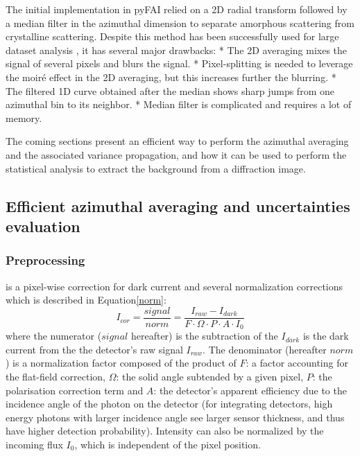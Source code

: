 \documentclass[preprint]{iucr}              %
\begin{document}
The initial implementation in pyFAI \cite{pdj2013} relied on a 2D radial transform followed by a median filter in the azimuthal dimension 
to separate amorphous scattering from crystalline scattering.
Despite this method has been successfully used for large dataset analysis \cite{brocades}, it has several major drawbacks:
* The 2D averaging mixes the signal of several pixels and blurs the signal. 
* Pixel-splitting is needed to leverage the moiré effect in the 2D averaging, but this increases further the blurring. 
* The filtered 1D curve obtained after the median shows sharp jumps from one azimuthal bin to its neighbor.
* Median filter is complicated and requires a lot of memory.
    
The coming sections present an efficient way to perform the azimuthal averaging and the associated variance propagation, 
and how it can be used to perform the statistical analysis to extract the background from a diffraction image. 

\subsection{Efficient azimuthal averaging and uncertainties evaluation}

\subsubsection{Preprocessing} is a pixel-wise correction for dark current and several normalization corrections\cite{pyfai_2020} which is described in Equation\ref{norm}:
\begin{equation}
\label{norm}
I_{cor} = \frac{signal}{norm}  = \frac{I_{raw} - I_{dark}}{F \cdot
\Omega \cdot P \cdot A \cdot I_0} 
\end{equation}
where the numerator ($signal$ hereafter) is the subtraction of the $I_{dark}$ is the dark current from the the detector's raw signal $I_{raw}$.
The denominator (hereafter $norm$) is a normalization factor composed of the product of  $F$:  a factor accounting for the flat-field correction, $\Omega$: the solid
angle subtended by a given pixel, $P$: the polarisation correction term and
$A$: the detector's apparent efficiency due to the incidence angle of the
photon on the detector (for integrating detectors, high energy photons with
larger incidence angle see larger sensor thickness, and thus have higher
detection probability).
Intensity can also be normalized by the incoming flux $I_0$, which is independent of the pixel position.
\end{document}

